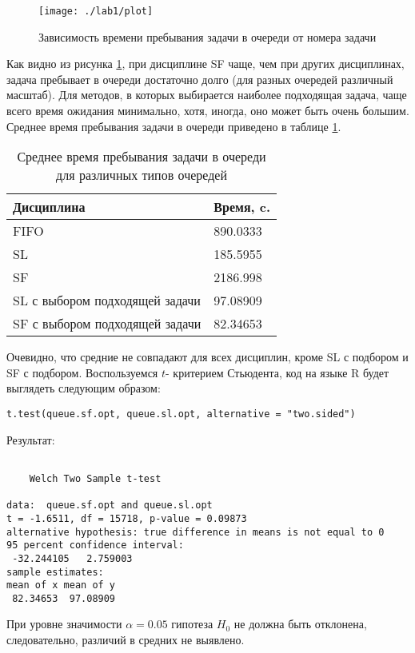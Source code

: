 \documentclass[russian, 14pt, a4paper]{extreport}
\begin{document}
\begin{figure}[t]
  \centering
  \texttt{[image: ./lab1/plot]}
\caption{Зависимость времени пребывания задачи в очереди от номера задачи}
\label{fig:queue_plot}
\end{figure}

Как видно из рисунка \ref{fig:queue_plot}, при дисциплине SF чаще, чем при других дисциплинах, задача пребывает в очереди достаточно долго (для разных очередей различный масштаб). Для методов, в которых выбирается наиболее подходящая задача, чаще всего время ожидания минимально, хотя, иногда, оно может быть очень большим. Среднее время пребывания задачи в очереди приведено в таблице \ref{tab:mean}.
\begin{table}[t]
  \centering
  \begin{tabular}[h]{|l|l|}
    \hline Дисциплина & Время, c. \\ \hline
    FIFO & 890.0333 \\ \hline
    SL & 185.5955 \\ \hline
    SF & 2186.998 \\ \hline
    SL с выбором подходящей задачи & 97.08909 \\ \hline
    SF с выбором подходящей задачи & 82.34653 \\ \hline
  \end{tabular}
  \caption{Среднее время пребывания задачи в очереди для различных типов очередей}
  \label{tab:mean}
\end{table}
Очевидно, что средние не совпадают для всех дисциплин, кроме SL с подбором и SF с подбором. Воспользуемся \(t\)- критерием Стьюдента, код на языке R будет выглядеть следующим образом:
\begin{verbatim}
t.test(queue.sf.opt, queue.sl.opt, alternative = "two.sided")
\end{verbatim}
Результат:
\begin{verbatim}

	Welch Two Sample t-test

data:  queue.sf.opt and queue.sl.opt
t = -1.6511, df = 15718, p-value = 0.09873
alternative hypothesis: true difference in means is not equal to 0
95 percent confidence interval:
 -32.244105   2.759003
sample estimates:
mean of x mean of y 
 82.34653  97.08909 
\end{verbatim}

При уровне значимости \(\alpha = 0.05\) гипотеза \(H_{0}\) не должна быть отклонена, следовательно, различий в средних не выявлено.
\end{document}
